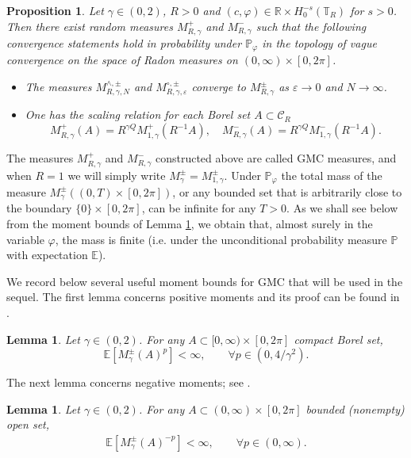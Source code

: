 \documentclass[11pt]{amsart}
\numberwithin{equation}{section}
\newtheorem{lemma}[theorem]{Lemma}
\newtheorem{proposition}[theorem]{Proposition}
\theoremstyle{definition}
\newcommand{\R}{\mathbb{R}}
\def\P{\mathbb{P}}
\def\E{\mathbb{E}}
\newcommand{\mc}{\mathcal}
\def\eps{\varepsilon}
\def\T{\mathbb{T}}
\begin{document}
\begin{proposition} \label{prop: GMC construction}
Let $\gamma \in (0,2)$, $R>0$ and $ (c,\varphi) \in  \R \times H^{-s}_0(\T_R)$ for $s>0$. Then there exist random measures $M^+_{R,\gamma}$ and $M^-_{R,\gamma}$ such that the following convergence statements hold in probability under $\P_{\varphi} $ in the topology of vague convergence on the space of Radon measures on $(0,\infty) \times [0,2\pi]$.
\begin{itemize}
\item The  measures $M^{\wedge,\pm}_{R,\gamma,N}$ and $M^{\circ,\pm}_{R,\gamma,\eps}$ converge to $M^\pm_{R,\gamma}$ as $\eps\to 0$ and $N\to \infty$.
\item One has the scaling relation for each Borel set $A\subset \mc{C}_R$
\[ M^{+}_{R,\gamma}(A)= R^{\gamma Q} M^{+}_{1,\gamma}(R^{-1}A), 
\quad
 M^{-}_{R,\gamma}(A)= R^{\gamma Q} M^{-}_{1,\gamma}(R^{-1}A).\]
\end{itemize} 
\end{proposition}
The measures $M_{R,\gamma}^+$ and $M_{R,\gamma}^-$ constructed above are called GMC measures, and when $R=1$ we will simply write $M_\gamma^\pm=M^\pm_{1,\gamma}$. Under $\P_{\varphi} $ the total mass of the measure $M_{\gamma}^\pm((0,T)\times [0,2\pi])$, or any bounded set that is arbitrarily close to the boundary $\{0\}\times[0,2\pi]$, can be infinite for any $T>0$. As we shall see below from the moment bounds of Lemma \ref{lem: GMC positive moments}, we obtain that, almost surely in the variable $\varphi$, the mass is finite (i.e. under the unconditional probability measure $\P$ with expectation $\E$).






We record below several useful moment bounds for GMC that will be used in the sequel. The first lemma concerns positive moments and its proof can be found in \cite[Prop. 3.3]{Robert_Vargas}.
\begin{lemma}\label{lem: GMC positive moments}
Let $\gamma \in (0,2)$. For any $A \subset [0,\infty)\times [0,2\pi]$ compact Borel set,
\begin{equation*}
\mathbb{E}[M^\pm_{\gamma}(A)^p] < \infty,
\qquad
\forall p \in (0, 4/\gamma^2).  
\end{equation*}
\end{lemma}
The next lemma concerns negative moments; see \cite[Prop. 3.6]{Robert_Vargas}.
\begin{lemma}\label{lem: GMC negative moments}
Let $\gamma \in (0,2)$. For any $A \subset (0,\infty)\times [0,2\pi]$ bounded (nonempty) open set,
\begin{align*}
\E[M^\pm_{\gamma}(A)^{-p}]
<
\infty, \qquad \forall p \in (0,\infty).    
\end{align*}
\end{lemma}
\end{document}
